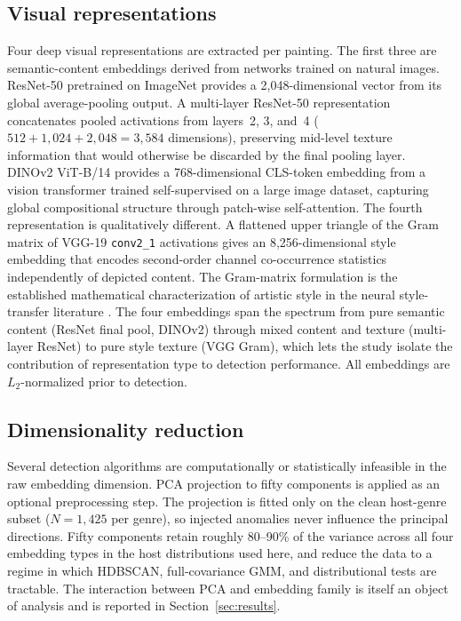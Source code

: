 \documentclass[conference]{IEEEtran}
\begin{document}
\subsection{Visual representations}

Four deep visual representations are extracted per painting. The first three are semantic-content embeddings derived from networks trained on natural images. ResNet-50 \cite{resnet} pretrained on ImageNet provides a 2{,}048-dimensional vector from its global average-pooling output. A multi-layer ResNet-50 representation concatenates pooled activations from layers~2, 3, and~4 ($512 + 1{,}024 + 2{,}048 = 3{,}584$ dimensions), preserving mid-level texture information that would otherwise be discarded by the final pooling layer. DINOv2 ViT-B/14 \cite{dinov2} provides a 768-dimensional CLS-token embedding from a vision transformer trained self-supervised on a large image dataset, capturing global compositional structure through patch-wise self-attention. The fourth representation is qualitatively different. A flattened upper triangle of the Gram matrix of VGG-19 \cite{vgg} \texttt{conv2\_1} activations gives an 8{,}256-dimensional style embedding that encodes second-order channel co-occurrence statistics independently of depicted content. The Gram-matrix formulation is the established mathematical characterization of artistic style in the neural style-transfer literature \cite{gatys}. The four embeddings span the spectrum from pure semantic content (ResNet final pool, DINOv2) through mixed content and texture (multi-layer ResNet) to pure style texture (VGG Gram), which lets the study isolate the contribution of representation type to detection performance. All embeddings are $L_2$-normalized prior to detection.

\subsection{Dimensionality reduction}

Several detection algorithms are computationally or statistically infeasible in the raw embedding dimension. PCA projection to fifty components is applied as an optional preprocessing step. The projection is fitted only on the clean host-genre subset ($N=1{,}425$ per genre), so injected anomalies never influence the principal directions. Fifty components retain roughly 80--90\% of the variance across all four embedding types in the host distributions used here, and reduce the data to a regime in which HDBSCAN, full-covariance GMM, and distributional tests are tractable. The interaction between PCA and embedding family is itself an object of analysis and is reported in Section~\ref{sec:results}.
\end{document}
